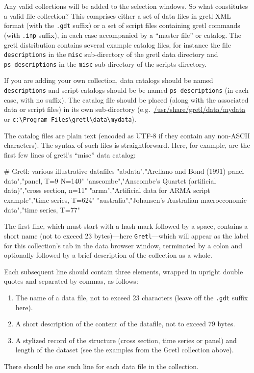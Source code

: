 Any valid collections will be added to the selection windows. So what
constitutes a valid file collection?  This comprises either a set of
data files in gretl XML format (with the \verb+.gdt+ suffix) or
a set of script files containing gretl commands (with \verb+.inp+
suffix), in each case accompanied by a ``master file'' or catalog.
The gretl distribution contains several example catalog files,
for instance the file \verb+descriptions+ in the \verb+misc+
sub-directory of the gretl data directory and
\verb+ps_descriptions+ in the \verb+misc+ sub-directory of the scripts
directory.

If you are adding your own collection, data catalogs should be named
\verb+descriptions+ and script catalogs should be be named
\verb+ps_descriptions+ (in each case, with no suffix).  The catalog
file should be placed (along with the associated data or script files)
in its own sub-directory (e.g.\ \url{/usr/share/gretl/data/mydata} or
\verb+c:\Program Files\gretl\data\mydata+).

The catalog files are plain text (encoded as UTF-8 if they contain any
non-ASCII characters). The syntax of such files is straightforward.
Here, for example, are the first few lines of gretl's ``misc'' data
catalog:

\begin{code}
# Gretl: various illustrative datafiles
"abdata","Arellano and Bond (1991) panel data","panel, T=9 N=140"
"anscombe","Anscombe's Quartet (artificial data)","cross section, n=11"
"arma","Artificial data for ARMA script example","time series, T=624"
"australia","Johansen's Australian macroeconomic data","time series, T=77"
\end{code}

The first line, which must start with a hash mark followed by a space,
contains a short name (not to exceed 23 bytes)---here
\texttt{Gretl}---which will appear as the label for this collection's
tab in the data browser window, terminated by a colon and optionally
followed by a brief description of the collection as a whole.

Each subsequent line should contain three elements, wrapped in upright
double quotes and separated by commas, as follows:
\begin{enumerate}
\item The name of a data file, not to exceed 23 characters (leave off
  the \verb+.gdt+ suffix here).
\item A short description of the content of the datafile, not to
  exceed 79 bytes.
\item A stylized record of the structure (cross section, time series
  or panel) and length of the dataset (see the examples from the
  \textsf{Gretl} collection above).
\end{enumerate}
There should be one such line for each data file in the collection.


